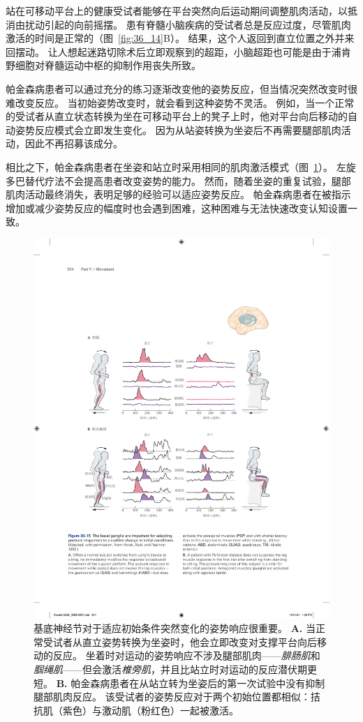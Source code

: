 站在可移动平台上的健康受试者能够在平台突然向后运动期间调整肌肉活动，以抵消由扰动引起的向前摇摆。
患有脊髓小脑疾病的受试者总是反应过度，尽管肌肉激活的时间是正常的（图~\ref{fig:36_14}B）。
结果，这个人返回到直立位置之外并来回摆动。
让人想起迷路切除术后立即观察到的超距，小脑超距也可能是由于浦肯野细胞对脊髓运动中枢的抑制作用丧失所致。


帕金森病患者可以通过充分的练习逐渐改变他的姿势反应，但当情况突然改变时很难改变反应。
当初始姿势改变时，就会看到这种姿势不灵活。
例如，当一个正常的受试者从直立状态转换为坐在可移动平台上的凳子上时，他对平台向后移动的自动姿势反应模式会立即发生变化。
因为从站姿转换为坐姿后不再需要腿部肌肉活动，因此不再招募该成分。


相比之下，帕金森病患者在坐姿和站立时采用相同的肌肉激活模式（图~\ref{fig:36_15}）。
左旋多巴替代疗法不会提高患者改变姿势的能力。
然而，随着坐姿的重复试验，腿部肌肉活动最终消失，表明足够的经验可以适应姿势反应。
帕金森病患者在被指示增加或减少姿势反应的幅度时也会遇到困难，这种困难与无法快速改变认知设置一致。


\begin{figure}[htbp]
	\centering
	\includegraphics[width=0.95\linewidth]{chap36/fig_36_15}
	\caption{基底神经节对于适应初始条件突然变化的姿势响应很重要\cite{horak1992postural}。
		\textbf{A.} 当正常受试者从直立姿势转换为坐姿时，他会立即改变对支撑平台向后移动的反应。
		坐着时对运动的姿势响应不涉及腿部肌肉——\textit{腓肠肌}和\textit{腘绳肌}——但会激活\textit{椎旁肌}，并且比站立时对运动的反应潜伏期更短。
		\textbf{B.} 帕金森病患者在从站立转为坐姿后的第一次试验中没有抑制腿部肌肉反应。
		该受试者的姿势反应对于两个初始位置都相似：拮抗肌（紫色）与激动肌（粉红色）一起被激活。}
	\label{fig:36_15}
\end{figure}


